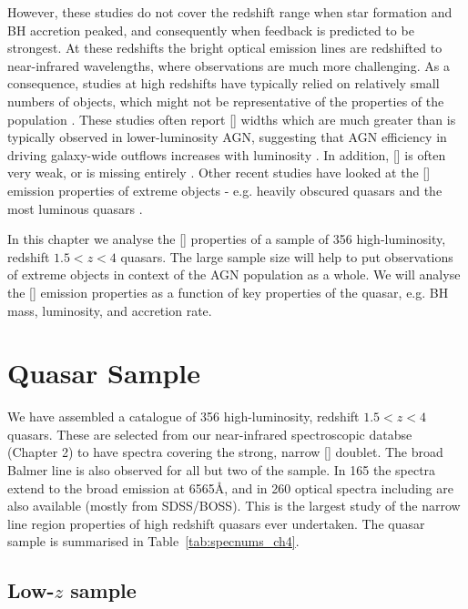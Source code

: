 However, these studies do not cover the redshift range when star formation and \ac{BH} accretion peaked, and consequently when feedback is predicted to be strongest. 
At these redshifts the bright optical emission lines are redshifted to near-infrared wavelengths, where observations are much more challenging. 
As a consequence, studies at high redshifts have typically relied on relatively small numbers of objects, which might not be representative of the properties of the population \citep[e.g.][]{netzer04,sulentic04,shen16a}.
These studies often report [] widths which are much greater than is typically observed in lower-luminosity AGN, suggesting that \ac{AGN} efficiency in driving galaxy-wide outflows increases with luminosity \citep[e.g.][]{netzer04,nesvadba08,kim13,brusa15,carniani15,perna15,bischetti16}. 
In addition, [] is often very weak, or is missing entirely \citep[e.g.][]{netzer04}. 
Other recent studies have looked at the [] emission properties of extreme objects - e.g. heavily obscured quasars \citep{zakamska16} and the most luminous quasars \citep{bischetti16}. 

In this chapter we analyse the [] properties of a sample of 356 high-luminosity, redshift $1.5 < z < 4$ quasars. 
The large sample size will help to put observations of extreme objects in context of the \ac{AGN} population as a whole.
We will analyse the [] emission properties as a function of key properties of the quasar, e.g. BH mass, luminosity, and accretion rate. 

\section{Quasar Sample}

We have assembled a catalogue of 356 high-luminosity, redshift $1.5 < z < 4$ quasars.
These are selected from our near-infrared spectroscopic databse (Chapter 2) to have spectra covering the strong, narrow [] doublet. 
The broad Balmer \hb line is also observed for all but two of the sample. 
In 165 the spectra extend to the broad \ha emission at 6565\AA, and in 260 optical spectra including  are also available (mostly from SDSS/BOSS). 
This is the largest study of the narrow line region properties of high redshift quasars ever undertaken. 
The quasar sample is summarised in Table~\ref{tab:specnums_ch4}.

\subsection{Low-$z$ sample}

